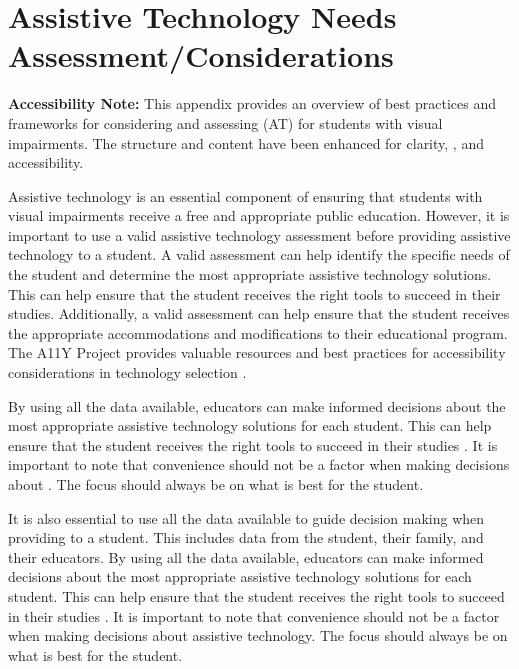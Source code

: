 \chapter{Assistive Technology Needs Assessment/Considerations}\label{app3:trouble3}

\noindent
\textbf{Accessibility Note:} This appendix provides an overview of best practices and frameworks for considering and assessing  (AT) for students with visual impairments. The structure and content have been enhanced for clarity, , and accessibility.

Assistive technology is an essential component of ensuring that students with visual impairments receive a free and appropriate public education. However, it is important to use a valid assistive technology assessment before providing assistive technology to a student. A valid assessment can help identify the specific needs of the student and determine the most appropriate assistive technology solutions. This can help ensure that the student receives the right tools to succeed in their studies. Additionally, a valid assessment can help ensure that the student receives the appropriate accommodations and modifications to their educational program. The A11Y Project provides valuable resources and best practices for accessibility considerations in technology selection \supercite{A11yProject}.

By using all the data available, educators can make informed decisions about the most appropriate assistive technology solutions for each student. This can help ensure that the student receives the right tools to succeed in their studies  \supercite{AEMCenter}. It is important to note that convenience should not be a factor when making decisions about . The focus should always be on what is best for the student.

It is also essential to use all the data available to guide decision making when providing  to a student. This includes data from the student, their family, and their educators. By using all the data available, educators can make informed decisions about the most appropriate assistive technology solutions for each student. This can help ensure that the student receives the right tools to succeed in their studies \supercite{AEMCenter}. It is important to note that convenience should not be a factor when making decisions about assistive technology. The focus should always be on what is best for the student.

